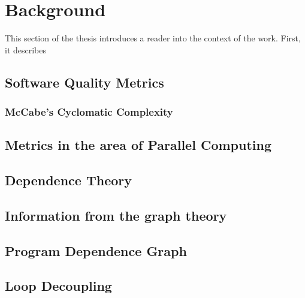\chapter{Background} \label{backgroud}

\qquad This section of the thesis introduces a reader into the context of the work. First, it describes  

\section{Software Quality Metrics} \label{background-software-quality-metrics}

\subsection{McCabe's Cyclomatic Complexity}
\cite{cyclomatic-complexity}

\section{Metrics in the area of Parallel Computing}

\section{Dependence Theory} \label{background-dependence-theory}
\cite{optimizing-compilers-book}

\section{Information from the graph theory}

\section{Program Dependence Graph}

\cite{pdg}

\section{Loop Decoupling} \label{background-loop-decoupling}

\cite{iterator-recognition}
